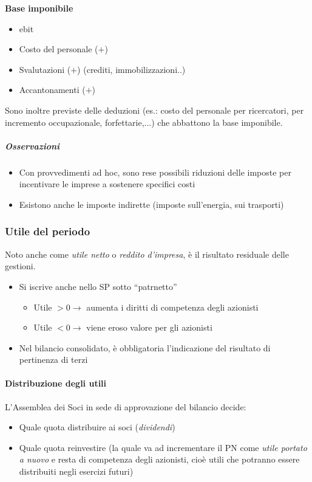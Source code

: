 \textbf{Base imponibile}
\begin{itemize}
    \item \gls{ebit} 
    \item Costo del personale ($+$)
    \item Svalutazioni ($+$) (crediti, immobilizzazioni..) 
    \item Accantonamenti ($+$)
\end{itemize}

Sono inoltre previste delle deduzioni (es.: costo del personale per
ricercatori, per incremento occupazionale, forfettarie,...) che abbattono la
base imponibile.

\subparagraph{Osservazioni}
\begin{itemize}
    \item Con provvedimenti ad hoc, sono rese possibili riduzioni delle imposte
    per incentivare le imprese a sostenere specifici costi
    \item Esistono anche le imposte indirette (imposte sull’energia, sui trasporti)
\end{itemize}

\subsubsection{Utile del periodo}
Noto anche come \emph{utile netto} o \emph{reddito d'impresa}, è il risultato residuale
delle gestioni.

\begin{itemize}
    \item Si iscrive anche nello SP sotto ``\gls{patrnetto}''
    \begin{itemize}
        \item Utile $> 0 \rightarrow$ aumenta i diritti di competenza degli azionisti
        \item Utile $< 0 \rightarrow$ viene eroso valore per gli azionisti
    \end{itemize}
    \item Nel bilancio consolidato, è obbligatoria l’indicazione del risultato di
    pertinenza di terzi
\end{itemize}

\paragraph{Distribuzione degli utili}
L’Assemblea dei Soci in sede di approvazione del bilancio decide:
\begin{itemize}
    \item Quale quota distribuire ai soci (\emph{dividendi})
    \item Quale quota reinvestire (la quale va ad incrementare il PN come
    \emph{utile portato a nuovo} e resta di competenza degli azionisti, cioè utili che potranno essere
    distribuiti negli esercizi futuri)
\end{itemize}

